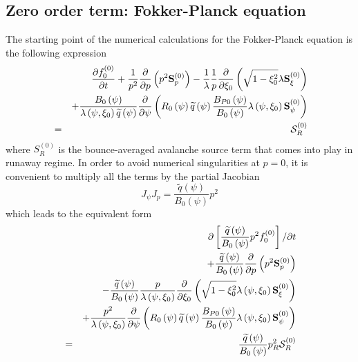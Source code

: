 

\subsection{Zero order term: Fokker-Planck equation}

The starting point of the numerical calculations for the Fokker-Planck
equation is the following expression
\begin{eqnarray}
&&\frac{\partial f_{0}^{\left( 0\right) }}{\partial t}+\frac{1}{p^{2}}\frac{%
\partial }{\partial p}\left( p^{2}\mathbf{S}_{p}^{\left( 0\right) }\right) -%
\frac{1}{\lambda }\frac{1}{p}\frac{\partial }{\partial \xi _{0}}\left( \sqrt{%
1-\xi _{0}^{2}}\lambda \mathbf{S}_{\xi }^{\left( 0\right) }\right)
\nonumber \\
&&+\frac{B_{0}\left( \psi \right) }{\lambda \left( \psi ,\xi _{0}\right)
\widetilde{q}\left( \psi \right) }\frac{\partial }{\partial \psi }\left(
R_{0}\left( \psi \right) \widetilde{q}\left( \psi \right) \frac{B_{P0}\left(
\psi \right) }{B_{0}\left( \psi \right) }\lambda \left( \psi ,\xi
_{0}\right) \mathbf{S}_{\psi }^{\left( 0\right) }\right)   \nonumber \\
&=&\mathcal{S}_{R}^{\left( 0\right) }
\end{eqnarray}
where $S_{R}^{\left( 0\right) }$ is the bounce-averaged avalanche source
term that comes into play in runaway regime. In order to avoid numerical
singularities at $p=0$, it is convenient to multiply all the terms by the
partial Jacobian
\begin{equation}
J_{\psi }J_{p}=\frac{\widetilde{q}\left( \psi \right) }{B_{0}\left( \psi
\right) }p^{2}
\end{equation}
which leads to the equivalent form
\begin{eqnarray}
&&\partial \left[ \frac{\widetilde{q}\left( \psi \right) }{B_{0}\left( \psi
\right) }p^{2}f_{0}^{\left( 0\right) }\right] /\partial t  \nonumber \\
&&+\frac{\widetilde{q}\left( \psi \right) }{B_{0}\left( \psi \right) }\frac{%
\partial }{\partial p}\left( p^{2}\mathbf{S}_{p}^{\left( 0\right) }\right)
\nonumber \\
&&-\frac{\widetilde{q}\left( \psi \right) }{B_{0}\left( \psi \right) }\frac{p%
}{\lambda \left( \psi ,\xi _{0}\right) }\frac{\partial }{\partial \xi _{0}}%
\left( \sqrt{1-\xi _{0}^{2}}\lambda \left( \psi ,\xi _{0}\right) \mathbf{S}%
_{\xi }^{\left( 0\right) }\right)   \nonumber \\
&&+\frac{p^{2}}{\lambda \left( \psi ,\xi _{0}\right) }\frac{\partial }{%
\partial \psi }\left( R_{0}\left( \psi \right) \widetilde{q}\left( \psi
\right) \frac{B_{P0}\left( \psi \right) }{B_{0}\left( \psi \right) }\lambda
\left( \psi ,\xi _{0}\right) \mathbf{S}_{\psi }^{\left( 0\right) }\right)
\nonumber \\
&=&\frac{\widetilde{q}\left( \psi \right) }{B_{0}\left( \psi \right) }%
p_{R}^{2}\mathcal{S}_{R}^{\left( 0\right) }
\end{eqnarray}

